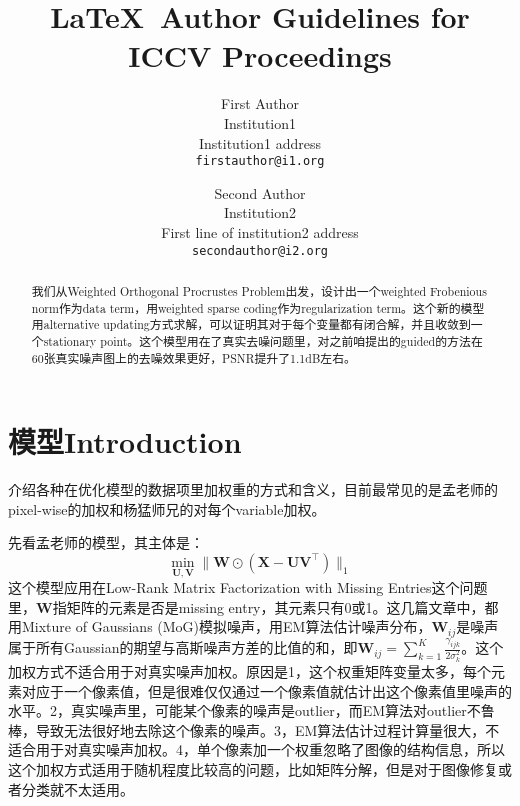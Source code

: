 \documentclass[10pt,twocolumn,letterpaper]{article}
\begin{document}
\title{\LaTeX\ Author Guidelines for ICCV Proceedings}

\author{First Author\\
Institution1\\
Institution1 address\\
{\tt\small firstauthor@i1.org}
\and
Second Author\\
Institution2\\
First line of institution2 address\\
{\tt\small secondauthor@i2.org}
}

\maketitle


\begin{abstract}
我们从Weighted Orthogonal Procrustes Problem出发，设计出一个weighted Frobenious norm作为data term，用weighted sparse coding作为regularization term。这个新的模型用alternative updating方式求解，可以证明其对于每个变量都有闭合解，并且收敛到一个stationary point。这个模型用在了真实去噪问题里，对之前咱提出的guided的方法在60张真实噪声图上的去噪效果更好，PSNR提升了1.1dB左右。
\end{abstract}

\section{模型Introduction}
介绍各种在优化模型的数据项里加权重的方式和含义，目前最常见的是孟老师的pixel-wise的加权和杨猛师兄的对每个variable加权。

先看孟老师的模型，其主体是：
\begin{equation}
\min_{\mathbf{U},\mathbf{V}}\|\mathbf{W}\odot(\mathbf{X}-\mathbf{U}\mathbf{V}^{\top})\|_{1}
\end{equation}
这个模型应用在Low-Rank Matrix Factorization with Missing Entries这个问题里，$\mathbf{W}$指矩阵的元素是否是missing entry，其元素只有0或1。这几篇文章中，都用Mixture of Gaussians (MoG)模拟噪声，用EM算法估计噪声分布，$\mathbf{W}_{ij}$是噪声属于所有Gaussian的期望与高斯噪声方差的比值的和，即$\mathbf{W}_{ij}=\sum_{k=1}^{K}\frac{\gamma_{ijk}}{2\sigma_{k}^{2}}$。这个加权方式不适合用于对真实噪声加权。原因是1，这个权重矩阵变量太多，每个元素对应于一个像素值，但是很难仅仅通过一个像素值就估计出这个像素值里噪声的水平。2，真实噪声里，可能某个像素的噪声是outlier，而EM算法对outlier不鲁棒，导致无法很好地去除这个像素的噪声。3，EM算法估计过程计算量很大，不适合用于对真实噪声加权。4，单个像素加一个权重忽略了图像的结构信息，所以这个加权方式适用于随机程度比较高的问题，比如矩阵分解，但是对于图像修复或者分类就不太适用。
\end{document}
